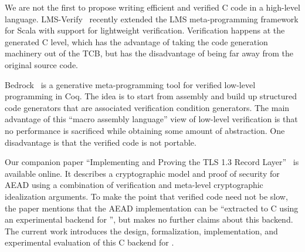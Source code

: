 \documentclass[acmsmall,review,anonymous]{acmart}\settopmatter{printfolios=true}
\begin{document}
We are not the first to propose writing efficient and verified C code
in a high-level language. LMS-Verify~\cite{lms-verify} recently
extended the LMS meta-programming framework for Scala with
support for lightweight verification. Verification
happens at the generated C level, which has the advantage of taking
the code generation machinery out of the TCB, but has the disadvantage
of being far away from the original source code.

Bedrock~\cite{chlipala2013bedrock} is a generative meta-programming
tool for verified low-level programming in Coq.
%
The idea is to start from assembly and build up structured code
generators that are associated verification condition generators.
%
The main advantage of this ``macro assembly language'' view of
low-level verification is that no performance is sacrificed while
obtaining some amount of abstraction.
%
One disadvantage is that the verified code is not portable.


Our companion paper ``Implementing and Proving
the TLS 1.3 Record Layer''~\cite{record} is available online.
It describes a cryptographic model and
proof of security for AEAD using a combination of \fstar verification
and meta-level cryptographic idealization arguments. To make the point that
verified code need not be slow, the paper mentions that the
AEAD implementation can be ``extracted to C using an experimental backend
for \fstar'', but makes no further claims about this backend. The
current work introduces the design, formalization,
implementation, and experimental evaluation of this C backend for \fstar.
%
\end{document}
